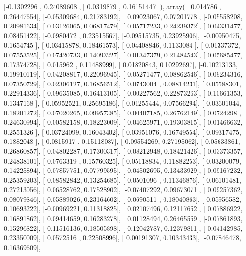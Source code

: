 \documentclass{article}
\begin{document}
       [-0.1302296 ,  0.24089608],
       [ 0.0319879 ,  0.16151447]]), array([[ 0.014786  ,  0.26447654],
       [-0.05309684,  0.21783192],
       [ 0.09023067,  0.07201778],
       [-0.05558208,  0.20981634],
       [ 0.03126065,  0.06817479],
       [-0.05717233,  0.24239372],
       [ 0.04331477,  0.08451422],
       [-0.0980472 ,  0.23515567],
       [-0.09515735,  0.23925906],
       [-0.00950475,  0.1654745 ],
       [ 0.03415878,  0.18461573],
       [ 0.04408846,  0.1133084 ],
       [ 0.01337372,  0.07553525],
       [-0.07420733,  0.14093227],
       [ 0.01347379,  0.21484543],
       [-0.05685477,  0.17374728],
       [ 0.015962  ,  0.11488999],
       [ 0.01820843,  0.10292697],
       [-0.10213133,  0.19910119],
       [-0.04208817,  0.22096945],
       [ 0.05271477,  0.08862546],
       [-0.09234316,  0.07350729],
       [-0.02306127,  0.16856512],
       [ 0.0743004 ,  0.08814231],
       [-0.05588301,  0.22914336],
       [-0.09635085,  0.16413105],
       [-0.00227562,  0.22873263],
       [-0.10661353,  0.1347168 ],
       [ 0.05952521,  0.25695186],
       [-0.01255444,  0.07566294],
       [-0.03601044,  0.18201272],
       [ 0.07020265,  0.09957385],
       [ 0.00407185,  0.26762149],
       [-0.0724298 ,  0.24630994],
       [ 0.00582158,  0.18223009],
       [ 0.04625971,  0.19303815],
       [-0.01466632,  0.2551326 ],
       [ 0.03724099,  0.16043402],
       [-0.03951076,  0.16749554],
       [ 0.09317475,  0.1882048 ],
       [-0.0815917 ,  0.15118087],
       [ 0.09554269,  0.27195062],
       [-0.05633861,  0.26860857],
       [ 0.04802287,  0.17300317],
       [ 0.08212948,  0.18421426],
       [-0.03373357,  0.24838101],
       [ 0.0763319 ,  0.15760325],
       [-0.05118834,  0.11882253],
       [ 0.03200079,  0.14225894],
       [-0.07857751,  0.07799595],
       [-0.04502695,  0.13433929],
       [-0.09167232,  0.25359203],
       [ 0.08582842,  0.13254685],
       [-0.0501096 ,  0.11346876],
       [ 0.06101481,  0.27213056],
       [ 0.06528762,  0.17528902],
       [-0.07407292,  0.09673071],
       [ 0.09257362,  0.08079846],
       [-0.05889026,  0.23164602],
       [ 0.0690511 ,  0.18040863],
       [-0.05956582,  0.10693222],
       [-0.00969221,  0.11318825],
       [ 0.02107496,  0.12117652],
       [ 0.07886922,  0.16891862],
       [ 0.09414659,  0.16283278],
       [ 0.01128494,  0.26465559],
       [-0.07861893,  0.15296822],
       [ 0.11516136,  0.18505898],
       [ 0.12042787,  0.12379811],
       [ 0.04142985,  0.23350009],
       [ 0.0572516 ,  0.22508996],
       [ 0.00191307,  0.10343433],
       [-0.07846478,  0.16369609],
\end{document}
